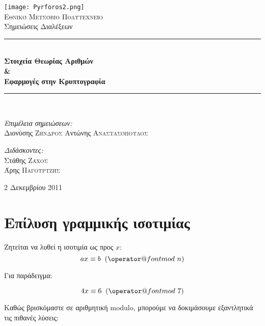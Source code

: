 \documentclass[11pt,a4paper]{book}
\makeatletter
\newcommand{\HRule}{\rule{\linewidth}{0.5mm}}
\def\imod#1{\allowbreak\mkern10mu({\operator@font mod}\,\,#1)}
\makeatother
\begin{document}
\begin{titlepage}
\begin{center}

\texttt{[image: Pyrforos2.png]}\\[1.cm]
\textsc{\LARGE Εθνικό Μετσόβιο Πολυτεχνείο}\\[1.5cm]

\Large{ Σημειώσεις Διαλέξεων }\\[0.5cm]

\begin{doublespace}
\HRule \\[0.4cm]
{\huge \bfseries
Στοιχεία Θεωρίας Αριθμών
\\
\&
\\
Εφαρμογές στην Κρυπτογραφία
}\\[0.4cm]
\end{doublespace}

\HRule \\[1.5cm]

\begin{minipage}{0.4\textwidth}
\begin{flushleft} \large
\emph{Επιμέλεια σημειώσεων:}\\
Διονύσης \textsc{Ζήνδρος}
Αντώνης \textsc{Αναστασόπουλος}
\end{flushleft}
\end{minipage}
\begin{minipage}{0.4\textwidth}
\begin{flushright} \large
\emph{Διδάσκοντες:} \\
Στάθης \textsc{Ζάχος}\\
Άρης \textsc{Παγουρτζής}
\end{flushright}
\end{minipage}

\vfill

{\large 2 Δεκεμβρίου 2011}
\end{center}
\end{titlepage}

\section*{Επίλυση γραμμικής ισοτιμίας}

Ζητείται να λυθεί η ισοτιμία ως προς $x$:
\[
ax \equiv b \imod n
\]

Για παράδειγμα:

\[
4x \equiv 6 \imod 7
\]

Καθώς βρισκόμαστε σε αριθμητική \textlatin{modulo}, μπορούμε να δοκιμάσουμε εξαντλητικά τις πιθανές λύσεις:
\end{document}
